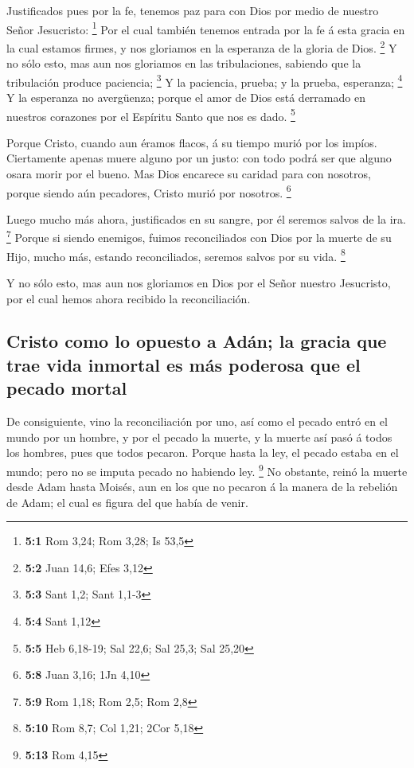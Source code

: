  Justificados pues por la fe, tenemos paz para con Dios
por medio de nuestro Señor Jesucristo: \footnote{\textbf{5:1} Rom 3,24;
  Rom 3,28; Is 53,5}  Por el cual también tenemos entrada
por la fe á esta gracia en la cual estamos firmes, y nos gloriamos en la
esperanza de la gloria de Dios. \footnote{\textbf{5:2} Juan 14,6; Efes
  3,12}  Y no sólo esto, mas aun nos gloriamos en las
tribulaciones, sabiendo que la tribulación produce paciencia;
\footnote{\textbf{5:3} Sant 1,2; Sant 1,1-3}  Y la
paciencia, prueba; y la prueba, esperanza; \footnote{\textbf{5:4} Sant
  1,12}  Y la esperanza no avergüenza; porque el amor de
Dios está derramado en nuestros corazones por el Espíritu Santo que nos
es dado. \footnote{\textbf{5:5} Heb 6,18-19; Sal 22,6; Sal 25,3; Sal
  25,20}

 Porque Cristo, cuando aun éramos flacos, á su tiempo
murió por los impíos.  Ciertamente apenas muere alguno por
un justo: con todo podrá ser que alguno osara morir por el bueno.
 Mas Dios encarece su caridad para con nosotros, porque
siendo aún pecadores, Cristo murió por nosotros. \footnote{\textbf{5:8}
  Juan 3,16; 1Jn 4,10}

 Luego mucho más ahora, justificados en su sangre, por él
seremos salvos de la ira. \footnote{\textbf{5:9} Rom 1,18; Rom 2,5; Rom
  2,8}  Porque si siendo enemigos, fuimos reconciliados
con Dios por la muerte de su Hijo, mucho más, estando reconciliados,
seremos salvos por su vida. \footnote{\textbf{5:10} Rom 8,7; Col 1,21;
  2Cor 5,18}

 Y no sólo esto, mas aun nos gloriamos en Dios por el
Señor nuestro Jesucristo, por el cual hemos ahora recibido la
reconciliación.

\hypertarget{cristo-como-lo-opuesto-a-aduxe1n-la-gracia-que-trae-vida-inmortal-es-muxe1s-poderosa-que-el-pecado-mortal}{%
\subsection{Cristo como lo opuesto a Adán; la gracia que trae vida
inmortal es más poderosa que el pecado
mortal}\label{cristo-como-lo-opuesto-a-aduxe1n-la-gracia-que-trae-vida-inmortal-es-muxe1s-poderosa-que-el-pecado-mortal}}

 De consiguiente, vino la reconciliación por uno, así
como el pecado entró en el mundo por un hombre, y por el pecado la
muerte, y la muerte así pasó á todos los hombres, pues que todos
pecaron.  Porque hasta la ley, el pecado estaba en el
mundo; pero no se imputa pecado no habiendo ley. \footnote{\textbf{5:13}
  Rom 4,15}  No obstante, reinó la muerte desde Adam
hasta Moisés, aun en los que no pecaron á la manera de la rebelión de
Adam; el cual es figura del que había de venir.

